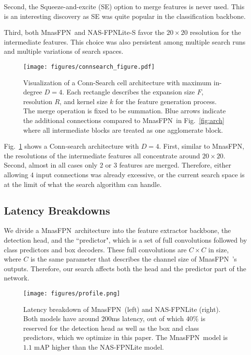 \documentclass[10pt,twocolumn,letterpaper]{article}
\def\Mnasfpn{MnasFPN~}
\def\Mnasfpnnospace{MnasFPN}
\begin{document}
    Second, the Squeeze-and-excite (SE) option to merge features is never used. This is an interesting discovery as SE was quite popular in the classification backbone.
    
    Third, both \Mnasfpn and NAS-FPNLite-S favor the $20\times20$ resolution for the intermediate features. This choice was also persistent among multiple search runs and multiple variations of search spaces.


\begin{figure}[!t]
    \centering
    \texttt{[image: figures/connsearch\_figure.pdf]}
    \caption{Visualization of a Conn-Search cell architecture with maximum in-degree $D=4$. Each rectangle describes the expansion size $F$, resolution $R$, and kernel size $k$ for the feature generation process. The merge operation is fixed to be summation. Blue arrows indicate the additional connections compared to \Mnasfpn in Fig.~\ref{fig:arch} where all intermediate blocks are treated as one agglomerate block. }
    \label{fig:connsearch_arch}
\end{figure}

Fig.~\ref{fig:connsearch_arch} shows a Conn-search architecture with $D=4$. First, similar to \Mnasfpnnospace, the resolutions of the intermediate features all concentrate around $20\times 20$. Second, almost in all cases only $2$ or $3$ features are merged. Therefore, either allowing $4$ input connections was already excessive, or the current search space is at the limit of what the search algorithm can handle. 

\subsection{Latency Breakdowns}
We divide a \Mnasfpn architecture into the feature extractor backbone, the detection head, and the ``predictor", which is a set of full convolutions followed by class predictors and box decoders. These full convolutions are $C\times C$ in size, where $C$ is the same parameter that describes the channel size of \Mnasfpn's outputs. Therefore, our search affects both the head and the predictor part of the network.

\begin{figure}[!t]
    \centering
    \texttt{[image: figures/profile.png]}
    \caption{Latency breakdown of \Mnasfpn (left) and NAS-FPNLite (right). Both models have around $200$ms latency, out of which $40\%$ is reserved for the detection head as well as the box and class predictors, which we optimize in this paper. The \Mnasfpn model is $1.1$ mAP higher than the NAS-FPNLite model.}
    \label{fig:profile}
\end{figure}
\end{document}

